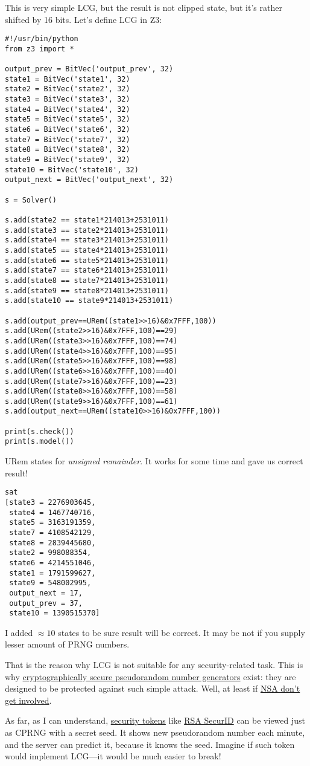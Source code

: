 This is very simple LCG, but the result is not clipped state, but it's rather shifted by 16 bits.
Let's define LCG in Z3:

\begin{lstlisting}
#!/usr/bin/python
from z3 import *

output_prev = BitVec('output_prev', 32)
state1 = BitVec('state1', 32)
state2 = BitVec('state2', 32)
state3 = BitVec('state3', 32)
state4 = BitVec('state4', 32)
state5 = BitVec('state5', 32)
state6 = BitVec('state6', 32)
state7 = BitVec('state7', 32)
state8 = BitVec('state8', 32)
state9 = BitVec('state9', 32)
state10 = BitVec('state10', 32)
output_next = BitVec('output_next', 32)

s = Solver()

s.add(state2 == state1*214013+2531011)
s.add(state3 == state2*214013+2531011)
s.add(state4 == state3*214013+2531011)
s.add(state5 == state4*214013+2531011)
s.add(state6 == state5*214013+2531011)
s.add(state7 == state6*214013+2531011)
s.add(state8 == state7*214013+2531011)
s.add(state9 == state8*214013+2531011)
s.add(state10 == state9*214013+2531011)

s.add(output_prev==URem((state1>>16)&0x7FFF,100))
s.add(URem((state2>>16)&0x7FFF,100)==29)
s.add(URem((state3>>16)&0x7FFF,100)==74)
s.add(URem((state4>>16)&0x7FFF,100)==95)
s.add(URem((state5>>16)&0x7FFF,100)==98)
s.add(URem((state6>>16)&0x7FFF,100)==40)
s.add(URem((state7>>16)&0x7FFF,100)==23)
s.add(URem((state8>>16)&0x7FFF,100)==58)
s.add(URem((state9>>16)&0x7FFF,100)==61)
s.add(output_next==URem((state10>>16)&0x7FFF,100))

print(s.check())
print(s.model())
\end{lstlisting}

URem states for \textit{unsigned remainder}.
It works for some time and gave us correct result!

\begin{lstlisting}
sat
[state3 = 2276903645,
 state4 = 1467740716,
 state5 = 3163191359,
 state7 = 4108542129,
 state8 = 2839445680,
 state2 = 998088354,
 state6 = 4214551046,
 state1 = 1791599627,
 state9 = 548002995,
 output_next = 17,
 output_prev = 37,
 state10 = 1390515370]
\end{lstlisting}

I added $\approx 10$ states to be sure result will be correct. It may be not if you supply lesser amount of PRNG numbers.

That is the reason why LCG is not suitable for any security-related task.
This is why \href{https://en.wikipedia.org/wiki/Cryptographically_secure_pseudorandom_number_generator}{cryptographically secure pseudorandom number generators} exist: they are designed to be protected against such simple attack.
Well, at least if \href{https://en.wikipedia.org/wiki/Dual_EC_DRBG}{NSA don't get involved}.

As far, as I can understand, \href{http://en.wikipedia.org/wiki/Security_token}{security tokens} like \href{http://en.wikipedia.org/wiki/RSA_SecurID}{RSA SecurID} can be viewed just as \ac{CPRNG} with a secret seed.
It shows new pseudorandom number each minute, and the server can predict it, because it knows the seed.
Imagine if such token would implement LCG---it would be much easier to break!

